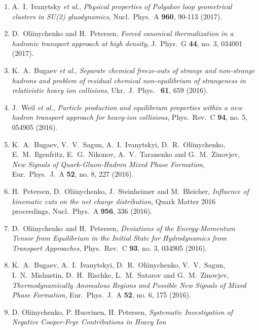 \begin{lebenslauf}
\begin{enumerate}
    \item A.~I.~Ivanytsky \textit{et al.},
          \emph{Physical properties of Polyakov loop geometrical clusters in SU(2)
                gluodynamics},
          Nucl.\ Phys.\ A \textbf{ 960}, 90-113 (2017).
    \item D.~Oliinychenko and H.~Petersen,
          \emph{Forced canonical thermalization in a hadronic transport approach at high
                density},
          J.\ Phys.\ G \textbf{ 44}, no. 3, 034001 (2017).            
    \item K.~A.~Bugaev \textit{et al.},
          \emph{Separate chemical freeze-outs of strange and non-strange hadrons and problem of
                residual chemical
                non-equilibrium of strangeness in relativistic heavy ion collisions},
          Ukr.\ J.\ Phys.\  \textbf{ 61}, 659 (2016).
    \item J.~Weil \textit{et al.},
          \emph{Particle production and equilibrium properties within a new hadron transport
                approach for heavy-ion collisions},
          Phys.\ Rev.\ C \textbf{ 94}, no. 5, 054905 (2016).
    \item  K.~A.~Bugaev, V.~V.~Sagun, A.~I.~Ivanytskyi, D.~R.~Oliinychenko, E.~M.~Ilgenfritz,
           E.~G.~Nikonov, A.~V.~Taranenko and G.~M.~Zinovjev,
           \emph{New Signals of Quark-Gluon-Hadron Mixed Phase Formation},
           Eur.\ Phys.\ J.\ A \textbf{ 52}, no. 8, 227 (2016).
    \item H.~Petersen, D.~Oliinychenko, J.~Steinheimer and M.~Bleicher,
          \emph{Influence of kinematic cuts on the net charge distribution},
          Quark Matter 2016 proceedings, Nucl.\ Phys.\ A \textbf{ 956}, 336 (2016).
    \item D.~Oliinychenko and H.~Petersen,
          \emph{Deviations of the Energy-Momentum Tensor from Equilibrium in the Initial State
                for Hydrodynamics from Transport Approaches},
          Phys.\ Rev.\ C \textbf{ 93}, no. 3, 034905 (2016).
    \item K.~A.~Bugaev, A.~I.~Ivanytskyi, D.~R.~Oliinychenko, V.~V.~Sagun, I.~N.~Mishustin,
          D.~H.~Rischke, L.~M.~Satarov and G.~M.~Zinovjev,
          \emph{Thermodynamically Anomalous Regions and Possible New Signals of Mixed Phase
                Formation},
          Eur.\ Phys.\ J.\ A \textbf{ 52}, no. 6, 175 (2016).
    \item D. Oliinychenko, P. Huovinen, H. Petersen,
          \emph{Systematic Investigation of Negative Cooper-Frye Contributions in Heavy Ion
}
\end{enumerate}
\end{lebenslauf}
